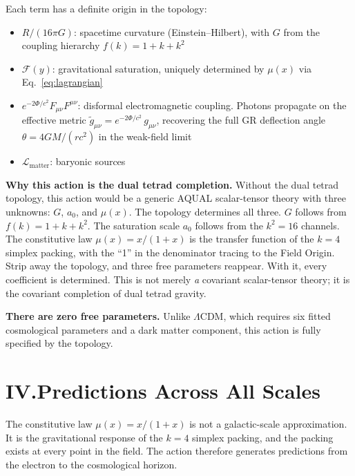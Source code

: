 \documentclass[11pt]{article}
\begin{document}
Each term has a definite origin in the topology:
\begin{itemize}[leftmargin=2em]
\item $R/(16\pi G)$: spacetime curvature (Einstein--Hilbert), with $G$ from the coupling hierarchy $f(k) = 1 + k + k^2$~\cite{nelson2026main}
\item $\mathcal{F}(y)$: gravitational saturation, uniquely determined by $\mu(x)$ via Eq.~\ref{eq:lagrangian}
\item $e^{-2\Phi/c^2} F_{\mu\nu}F^{\mu\nu}$: disformal electromagnetic coupling. Photons propagate on the effective metric $\tilde{g}_{\mu\nu} = e^{-2\Phi/c^2}\,g_{\mu\nu}$, recovering the full GR deflection angle $\theta = 4GM/(rc^2)$ in the weak-field limit
\item $\mathcal{L}_{\text{matter}}$: baryonic sources
\end{itemize}

\textbf{Why this action is the dual tetrad completion.}\quad
Without the dual tetrad topology, this action would be a generic AQUAL scalar-tensor theory with three unknowns: $G$, $a_0$, and $\mu(x)$. The topology determines all three. $G$ follows from $f(k) = 1 + k + k^2$. The saturation scale $a_0$ follows from the $k^2 = 16$ channels. The constitutive law $\mu(x) = x/(1+x)$ is the transfer function of the $k = 4$ simplex packing, with the ``1'' in the denominator tracing to the Field Origin. Strip away the topology, and three free parameters reappear. With it, every coefficient is determined. This is not merely \emph{a} covariant scalar-tensor theory; it is the covariant completion of dual tetrad gravity.

\textbf{There are zero free parameters.} Unlike $\Lambda$CDM, which requires six fitted cosmological parameters and a dark matter component, this action is fully specified by the topology.

\section*{IV.\quad Predictions Across All Scales}

The constitutive law $\mu(x) = x/(1+x)$ is not a galactic-scale approximation. It is the gravitational response of the $k = 4$ simplex packing, and the packing exists at every point in the field. The action therefore generates predictions from the electron to the cosmological horizon.
\end{document}
